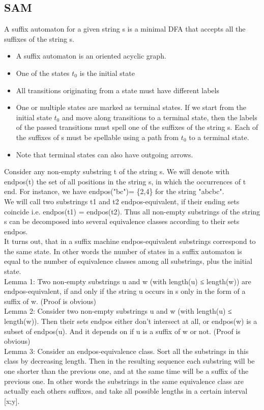 \documentclass[8pt, a4paper, oneside, twocolumn]{extarticle}
\begin{document}
\subsection{SAM}
A suffix automaton for a given string s is a minimal DFA that accepts all the suffixes of the string s.
\begin{itemize}
	\item A suffix automaton is an oriented acyclic graph.
	\item One of the states $t_0$ is the initial state
	\item All transitions originating from a state must have different labels
	\item One or multiple states are marked as terminal states. If we start from the initial state $t_0$ and move along transitions to a terminal state, then the labels of the passed transitions must spell one of the suffixes of the string s. Each of the suffixes of s must be spellable using a path from $t_0$ to a terminal state.
    \item Note that terminal states can also have outgoing arrows.
\end{itemize}
Consider any non-empty substring t of the string s. We will denote with endpos(t) the set of all positions in the string s, in which the occurrences of t end. For instance, we have endpos("bc")= \{2,4\} for the string "abcbc".\\
We will call two substrings t1 and t2 endpos-equivalent, if their ending sets coincide i.e. endpos(t1) = endpos(t2). Thus all non-empty substrings of the string s can be decomposed into several equivalence classes according to their sets endpos.\\
It turns out, that in a suffix machine endpos-equivalent substrings correspond to the same state. In other words the number of states in a suffix automaton is equal to the number of equivalence classes among all substrings, plus the initial state.\\
Lemma 1: Two non-empty substrings u and w (with length(u) ≤ length(w)) are endpos-equivalent, if and only if the string u occurs in s only in the form of a suffix of w. (Proof is obvious)\\
Lemma 2: Consider two non-empty substrings u and w (with length(u) ≤ length(w)). Then their sets endpos either don't intersect at all, or endpos(w) is a subset of endpos(u). And it depends on if u is a suffix of w or not. (Proof is obvious)\\
Lemma 3: Consider an endpos-equivalence class. Sort all the substrings in this class by decreasing length. Then in the resulting sequence each substring will be one shorter than the previous one, and at the same time will be a suffix of the previous one. In other words the substrings in the same equivalence class are actually each others suffixes, and take all possible lengths in a certain interval [x;y].\\
\end{document}
